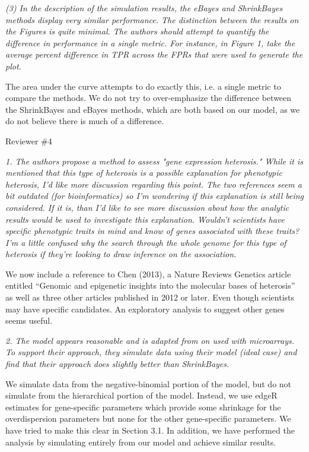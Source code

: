\documentclass{article}
\newcommand{\comment}[1]{\textit{#1}}
\newcommand{\response}[1]{#1}
\begin{document}
\comment{(3) In the description of the simulation results, the eBayes and ShrinkBayes methods display very similar performance. The distinction between the results on the Figures is quite minimal. The authors should attempt to quantify the difference in performance in a single metric. For instance, in Figure 1, take the average percent difference in TPR across the FPRs that were used to generate the plot.}

\response{The area under the curve attempts to do exactly this, i.e. a single metric to compare the methods. We do not try to over-emphasize the difference between the ShrinkBayes and eBayes methods, which are both based on our model, as we do not believe there is much of a difference.}



Reviewer \#4

\comment{1. The authors propose a method to assess "gene expression heterosis."   While it is mentioned that this type of heterosis is a possible explanation for phenotypic heterosis, I'd like more discussion regarding this point.  The two references seem a bit outdated (for bioinformatics) so I'm wondering if this explanation is still being considered.  If it is, than I'd like to see more discussion about how the analytic results would be used to investigate this explanation.   Wouldn't scientists have specific phenotypic traits in mind and know of genes associated with these traits?  I'm a little confused why the search through the whole genome for this type of heterosis if they're looking to draw inference on the association.}

\response{We now include a reference to Chen (2013), a Nature Reviews Genetics article entitled ``Genomic and epigenetic insights into the molecular bases of heterosis'' as well as three other articles published in 2012 or later. Even though scientists may have specific candidates. An exploratory analysis to suggest other genes seems useful.} 

\comment{2. The model appears reasonable and is adapted from on used with microarrays.  To support their approach, they simulate data using their model (ideal case) and find that their approach does slightly better than ShrinkBayes.}

\response{We simulate data from the negative-binomial portion of the model, but do not simulate from the hierarchical portion of the model. Instead, we use edgeR estimates for gene-specific parameters which provide some shrinkage for the overdispersion parameters but none for the other gene-specific parameters. We have tried to make this clear in Section 3.1. In addition, we have performed the analysis by simulating entirely from our model and achieve similar results.}
\end{document}

